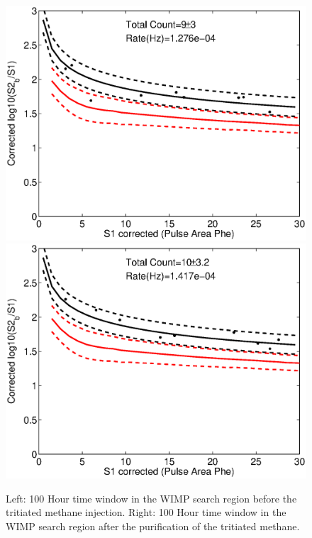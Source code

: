 \begin{figure}[H]\centering
\includegraphics[scale=0.25]{CH3T_fid_30_before_100_18_lux10_20130813T1120_cp05328_note.eps}
\includegraphics[scale=0.25]{CH3T_fid_30_after_100_18_afterlux10_20130813T1120_cp05328_note.eps}
\caption{Left: 100 Hour time window in the WIMP search region before the tritiated methane injection. Right: 100 Hour time window in the WIMP search region after the purification of the tritiated methane. }
\label{fig:Removal_2}
\end{figure}

 
 